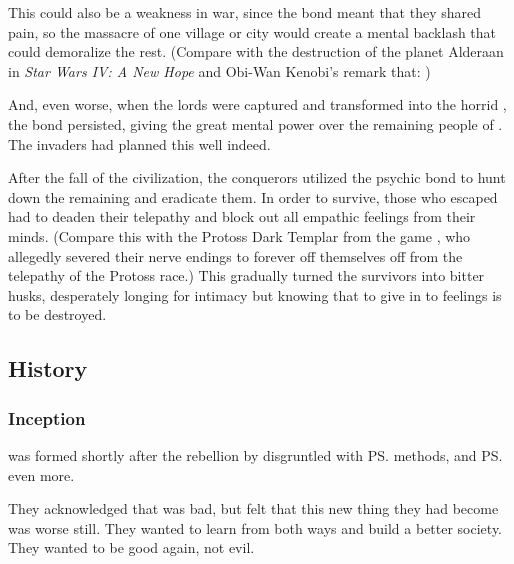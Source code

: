 This could also be a weakness in war, since the bond meant that they shared pain, so the massacre of one \Kezeradi{} village or city would create a mental backlash that could demoralize the rest. (Compare with the destruction of the planet Alderaan in \emph{Star Wars IV: A New Hope} and Obi-Wan Kenobi's remark that: )

And, even worse, when the \Kezeradi{} lords were captured and transformed into the horrid \Sephiroth, the bond persisted, giving the \Sephiroth{} great mental power over the remaining people of \Kezerad. The invaders had planned this well indeed. 

After the fall of the \Kezeradi{} civilization, the conquerors utilized the psychic bond to hunt down the remaining \Kezeradi{} and eradicate them. In order to survive, those who escaped had to deaden their telepathy and block out all empathic feelings from their minds. 
(Compare this with the Protoss Dark Templar from the game \cite{VideoGame:Starcraft}, who allegedly severed their nerve endings to forever off themselves off from the telepathy of the Protoss race.) 
This gradually turned the survivors into bitter husks, desperately longing for intimacy but knowing that to give in to feelings is to be destroyed. 








\subsection{History}
\subsubsection{Inception}
\Kezerad{} was formed shortly after the \Merkyran{} rebellion by \resphain{} disgruntled with \ps{\Azraid}{} methods, and \ps{\Zachirah}{} even more. 

They acknowledged that \Merkyrah{} was bad, but felt that this new thing they had become was worse still. 
They wanted to learn from both ways and build a better society. 
They wanted to be good again, not evil. 

